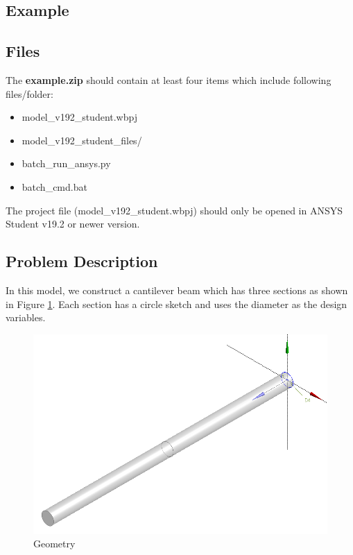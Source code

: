 \documentclass[12pt]{kjleehw}
\begin{document}
\begin{CJK}{UTF8}{bkai}
\section{Example}

\subsection{Files}

The \textbf{example.zip} should contain at least four items which include following files/folder:

\begin{itemize}
  \item model\_v192\_student.wbpj
  \item model\_v192\_student\_files/
  \item batch\_run\_ansys.py
  \item batch\_cmd.bat
\end{itemize}

The project file (model\_v192\_student.wbpj) should only be opened in ANSYS Student v19.2 or newer version.

\subsection{Problem Description}

In this model, we construct a cantilever beam which has three sections as shown in Figure \ref{fig:cantilever}. Each section has a circle sketch and uses the diameter as the design variables.\\

\begin{figure}[h]
	\centering
	\includegraphics[scale=0.4]{figure/cantilever.png}
	\caption{Geometry}
	\label{fig:cantilever}
\end{figure}


\end{CJK}
\end{document}
